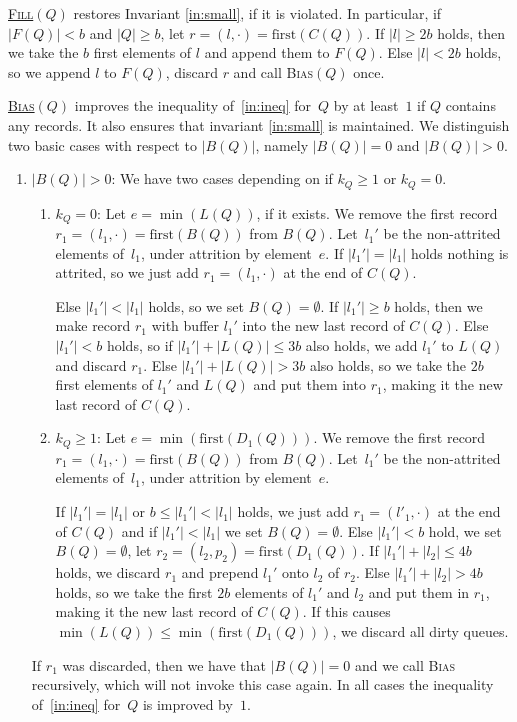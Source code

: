 \documentclass{sig-alternate}
\def\extraspacing{\vspace{2mm} \noindent}
\newcommand{\first}{\text{first}}
\newcommand{\iref}[1]{\ref{#1}} \newcommand{\attr}[1]{\widetilde{#1}}
\renewcommand{\(}{\left(}
\renewcommand{\)}{\right)}
\begin{document}
\extraspacing \underline{\textsc{Fill}$(Q)$} restores Invariant \iref{in:small},
if it is violated. In particular, if $|F(Q)| < b$ and $|Q| \geq b$, let $r =
(l,\cdot) = \first(C(Q))$. If $|l| \geq 2b$ holds, then we take the $b$ first
elements of $l$ and append them to $F(Q)$. Else $|l| < 2b$ holds, so we append
$l$ to $F(Q)$, discard $r$ and call \textsc{Bias}$(Q)$ once.

\extraspacing \underline{\textsc{Bias}$(Q)$} improves the inequality
of~\iref{in:ineq} for~$Q$ by at least~$1$ if $Q$ contains any records. It also
ensures that invariant \iref{in:small} is maintained. We distinguish two
basic cases with respect to $|B(Q)|$, namely $|B(Q)|=0$ and $|B(Q)| > 0$.

\begin{enumerate}
  \item \label{it:Blg0} $|B(Q)| > 0$: We have two cases depending on if $k_Q
    \geq 1$ or $k_Q = 0$.
    \begin{enumerate}[label=\arabic*)]
      \item $k_Q = 0$: Let $e = \min(L(Q))$, if it exists. We remove the first
        record $r_1 =(l_1,\cdot) = \first(B(Q))$ from $B(Q)$. Let~$l_1'$ be the
        non-attrited elements of~$l_1$, under attrition by element~$e$. If
        $|l_1'| = |l_1|$ holds nothing is attrited, so we just add $r_1 =
        (l_1,\cdot)$ at the end of $C(Q)$.

        Else $|l_1'| < |l_1|$ holds, so we set $B(Q) = \emptyset$. If $|l_1'|
        \geq b$ holds, then we make record $r_1$ with buffer $l_1'$ into the new
        last record of $C(Q)$. Else $|l_1'| < b$ holds, so if $|l_1'| + |L(Q)|
        \leq 3b$ also holds, we add $l_1'$ to $L(Q)$ and discard $r_1$. Else
        $|l_1'| + |L(Q)| > 3b$ also holds, so we take the $2b$ first elements of
        $l_1'$ and $L(Q)$ and put them into $r_1$, making it the new last record
        of $C(Q)$.

      \item $k_Q \geq 1$: Let $e = \min(\first(D_1(Q)))$. We remove the first
        record $r_1 =(l_1,\cdot) = \first(B(Q))$ from $B(Q)$. Let~$l_1'$ be the
        non-attrited elements of~$l_1$, under attrition by element~$e$.

        If $|l_1'| = |l_1|$ or $b \leq |l_1'| < |l_1|$ holds, we just add $r_1 =
        (l'_1,\cdot)$ at the end of $C(Q)$ and if $|l_1'| < |l_1|$ we set
        $B(Q)=\emptyset$. Else $|l_1'| < b$ hold, we set $B(Q) = \emptyset$,
        let $r_2 = (l_2,p_2) = \first(D_1(Q))$. If $|l_1'| + |l_2| \leq 4b$
        holds, we discard $r_1$ and prepend $l_1'$ onto $l_2$ of $r_2$. Else
        $|l_1'| + |l_2| > 4b$ holds, so we take the first $2b$ elements of
        $l_1'$ and $l_2$ and put them in $r_1$, making it the new last record of
        $C(Q)$. If this causes $\min(L(Q)) \leq \min(\first(D_1(Q)))$, we
        discard all dirty queues.
    \end{enumerate}
    If $r_1$ was discarded, then we have that $|B(Q)| = 0$ and we call
    \textsc{Bias} recursively, which will not invoke this case again. In
    all cases the inequality of~\iref{in:ineq} for~$Q$ is improved by~$1$.


\end{enumerate}
\end{document}
